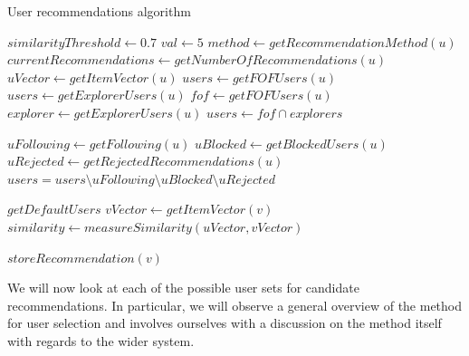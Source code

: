 \begin{algorithm}
\caption{User recommendations algorithm}
\label{alg:user-recommendations}
\begin{algorithmic}[1]
\State $similarityThreshold\gets 0.7$
\State $val\gets 5$
	\State $method\gets getRecommendationMethod(u)$
	\State $currentRecommendations\gets getNumberOfRecommendations(u)$
		\State $uVector\gets getItemVector(u)$
			\State $users\gets getFOFUsers(u)$
		\EndIf
			\State $users\gets getExplorerUsers(u)$
		\EndIf
			\State $fof\gets getFOFUsers(u)$
			\State $explorer\gets getExplorerUsers(u)$
			\State $users\gets fof \cap explorers$
		\EndIf
		
		\State $uFollowing\gets getFollowing(u)$
		\State $uBlocked\gets getBlockedUsers(u)$
		\State $uRejected\gets getRejectedRecommendations(u)$
		\State $users = users \setminus uFollowing \setminus uBlocked \setminus uRejected$
		
			\State $getDefaultUsers$
		\Else
				\State $vVector\gets getItemVector(v)$
				\State $similarity\gets measureSimilarity(uVector, vVector)$
			
					\State $storeRecommendation(v)$
				\EndIf
			\EndFor
		\EndIf
	\EndIf
\EndFor
\end{algorithmic}
\end{algorithm}

We will now look at each of the possible user sets for candidate recommendations. In particular, we will observe a general overview of the method for user selection and involves ourselves with a discussion on the method itself with regards to the wider system.

